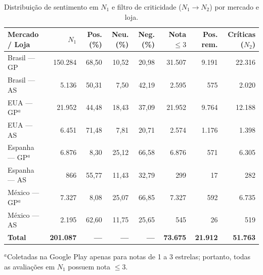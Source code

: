 \begin{table}[htbp]
\centering
\caption{Distribuição de sentimento em $N_1$ e filtro de criticidade ($N_1 \to N_2$) por mercado e loja.}
\label{tab:sentimento}
\footnotesize
\setlength{\tabcolsep}{3.5pt}
\begin{tabular}{lrrrrrrr}
\toprule
\textbf{Mercado / Loja} & \textbf{$N_1$} & \textbf{Pos. (\%)} & \textbf{Neu. (\%)} & \textbf{Neg. (\%)} & \textbf{Nota $\le 3$} & \textbf{Pos. rem.} & \textbf{Críticas ($N_2$)} \\
\midrule
Brasil --- GP         & 150.284 & 68{,}50 & 10{,}52 & 20{,}98 & 31.507 &  9.191 & 22.316 \\
Brasil --- AS         &   5.136 & 50{,}31 &  7{,}50 & 42{,}19 &  2.595 &    575 &  2.020 \\
EUA --- GP$^a$        &  21.952 & 44{,}48 & 18{,}43 & 37{,}09 & 21.952 &  9.764 & 12.188 \\
EUA --- AS            &   6.451 & 71{,}48 &  7{,}81 & 20{,}71 &  2.574 &  1.176 &  1.398 \\
Espanha --- GP$^a$    &   6.876 &  8{,}30 & 25{,}12 & 66{,}58 &  6.876 &    571 &  6.305 \\
Espanha --- AS        &     866 & 55{,}77 & 11{,}43 & 32{,}79 &    299 &     17 &    282 \\
México --- GP$^a$     &   7.327 &  8{,}08 & 25{,}07 & 66{,}85 &  7.327 &    592 &  6.735 \\
México --- AS         &   2.195 & 62{,}60 & 11{,}75 & 25{,}65 &    545 &     26 &    519 \\
\midrule
\textbf{Total}        & \textbf{201.087} & \textbf{---} & \textbf{---} & \textbf{---} & \textbf{73.675} & \textbf{21.912} & \textbf{51.763} \\
\bottomrule
\end{tabular}

\smallskip
\raggedright\scriptsize
$^a$Coletadas na Google Play apenas para notas de 1 a 3 estrelas; portanto, todas as avaliações em $N_1$ possuem nota $\le 3$.
\end{table}

